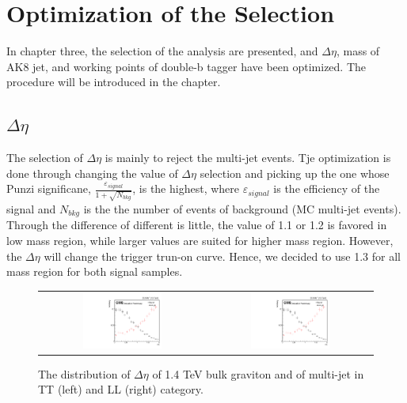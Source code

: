
\chapter{Optimization of the Selection} \label{Optimization of Selection}
In chapter three, the selection of the analysis are presented, and $\Delta \eta$, mass of AK8 jet, and working points of double-b tagger have been optimized. The procedure will be introduced in the chapter.

\section{$\Delta \eta$}
The selection of $\Delta \eta$ is mainly to reject the multi-jet events. Tje optimization is done through changing the value of $\Delta \eta$ selection and picking up the one whose Punzi significane, $\frac{\varepsilon _{signal}}{1+\sqrt{N_{bkg}}}$, is the highest, where $\varepsilon _{signal}$ is the efficiency of the signal and $N_{bkg}$ is the the number of events of background (MC multi-jet events). Through the difference of different is little, the value of 1.1 or 1.2 is favored in low mass region, while larger values are suited for higher mass region. However, the $\Delta \eta$ will change the trigger trun-on curve. Hence, we decided to use 1.3 for all mass region for both signal samples.

\begin{figure}[t]
  \centering
  \begin{tabular}{cc}
    \includegraphics[width=0.5\textwidth]{Figures/deta/bulk/TT1400.pdf} &
       \includegraphics[width=0.5\textwidth]{Figures/deta/bulk/TT1400.pdf}
  \end{tabular}
  \caption{The distribution of $\Delta \eta$ of 1.4 TeV bulk graviton and of multi-jet in TT (left) and LL (right) category.}
  \label{fig:hvt_brs}
\end{figure}

